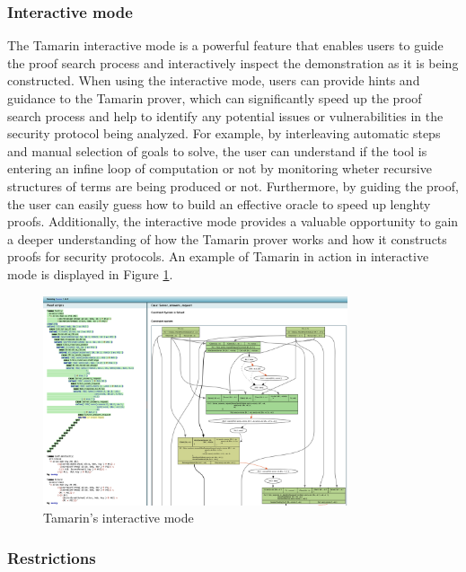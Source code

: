 \documentclass[fleqn,10pt]{SelfArx} %
\begin{document}
\subsubsection{Interactive mode}\label{subsec:tamarinGui}

The Tamarin interactive mode is a powerful feature that enables users to guide the proof search process and interactively inspect the demonstration as it is being constructed. When using the interactive mode, users can provide hints and guidance to the Tamarin prover, which can significantly speed up the proof search process and help to identify any potential issues or vulnerabilities in the security protocol being analyzed. For example, by interleaving automatic steps and manual selection of goals to solve, the user can understand if the tool is entering an infine loop of computation or not by monitoring wheter recursive structures of terms are being produced or not. Furthermore, by guiding the proof, the user can easily guess how to build an effective oracle to speed up lenghty proofs. Additionally, the interactive mode provides a valuable opportunity to gain a deeper understanding of how the Tamarin prover works and how it constructs proofs for security protocols. An example of Tamarin in action in interactive mode is displayed in Figure \ref{fig:interactive}.

\begin{figure}
    \centering
    \captionsetup{justification=centering, margin=1cm}
    \includegraphics[width=0.8\textwidth]{Figures/gui.png}
    \caption{Tamarin's interactive mode}
    \label{fig:interactive}
\end{figure}

\subsubsection{Restrictions}
\end{document}
